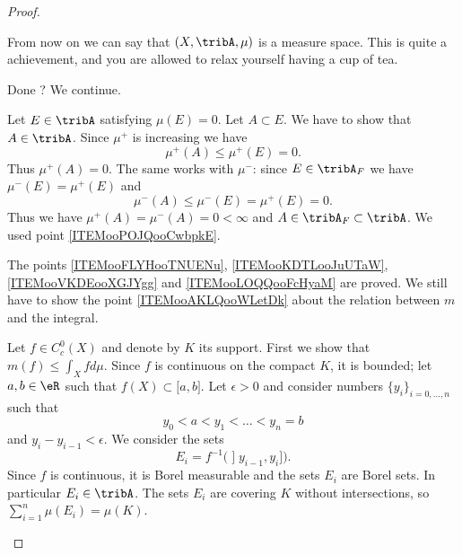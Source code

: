\begin{proof}
\begin{subproof}
            From now on we can say that \( (X,\tribA,\mu)\) is a measure space. This is quite a achievement, and you are allowed to relax yourself having a cup of tea.

            Done ? We continue.

             
            Let \( E\in\tribA\) satisfying \( \mu(E)=0\). Let \( A\subset E\). We have to show that \( A\in\tribA\). Since \( \mu^+\) is increasing we have
            \begin{equation}
                \mu^+(A)\leq \mu^+(E)=0.
            \end{equation}
            Thus \( \mu^+(A)=0\). The same works with \( \mu^-\): since \( E\in\tribA_F\) we have \( \mu^-(E)=\mu^+(E)\) and
            \begin{equation}
                \mu^-(A)\leq \mu^-(E)=\mu^+(E)=0.
            \end{equation}
            Thus we have \( \mu^+(A)=\mu^-(A)=0<\infty\) and \( A\in \tribA_F\subset\tribA\). We used point \ref{ITEMooPOJQooCwbpkE}.

            \spitem[Summary]
             
            The points \ref{ITEMooFLYHooTNUENu}, \ref{ITEMooKDTLooJuUTaW}, \ref{ITEMooVKDEooXGJYgg} and \ref{ITEMooLOQQooFcHyaM} are proved. We still have to show the point \ref{ITEMooAKLQooWLetDk} about the relation between \( m\) and the integral.


            Let \( f\in C_c^0(X)\) and denote by \( K\) its support. First we show that \( m(f)\leq \int_Xfd\mu\). Since \( f\) is continuous on the compact \( K\), it is bounded; let \( a,b\in \eR\) such that \( f(X)\subset \mathopen[ a , b \mathclose]\). Let \( \epsilon>0\) and consider numbers \( \{ y_i \}_{i=0,\ldots, n}\) such that
            \begin{equation}
                y_0<a<y_1<\ldots<y_n=b
            \end{equation}
            and \( y_i-y_{i-1}<\epsilon\). We consider the sets
            \begin{equation}
                E_i=f^{-1}\big( \mathopen] y_{i-1} , y_i \mathclose] \big).
            \end{equation}
            Since \( f\) is continuous, it is Borel measurable and the sets \( E_i\) are Borel sets. In particular \( E_i\in\tribA\). The sets \( E_i\) are covering \( K\) without intersections, so \( \sum_{i=1}^n\mu(E_i)=\mu(K)\).


\end{subproof}
\end{proof}
